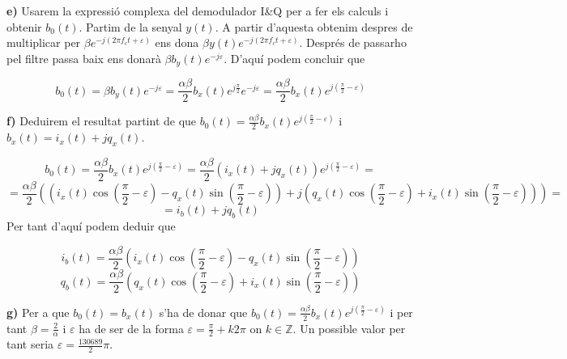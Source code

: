 \documentclass[12pt, a4papre]{article}
\begin{document}
	\textbf{e)} Usarem la expressió complexa del demodulador I\&Q per a fer els calculs i obtenir $b_0(t)$. Partim de la senyal $y(t)$. A partir d'aquesta obtenim despres de multiplicar per $\beta e^{-j(2\pi f_ct + \varepsilon)}$ ens dona $ \beta y(t)e^{-j(2\pi f_ct + \varepsilon)}$. Després de passarho pel filtre passa baix ens donarà $ \beta b_y(t) e^{-j\varepsilon}$. D'aquí podem concluir que
	
	\[
		b_0(t) = \beta b_y(t) e^{-j\varepsilon} = \frac{\alpha\beta}{2}b_x(t)e^{j\frac{\pi}{2}}e^{-j\varepsilon} = \frac{\alpha\beta}{2}b_x(t)e^{j(\frac{\pi}{2} - \varepsilon)}
	\]
	
	\textbf{f)} Deduirem el resultat partint de que $b_0(t) = \frac{\alpha\beta}{2}b_x(t)e^{j(\frac{\pi}{2} - \varepsilon)}$ i $b_x(t) = i_x(t) + jq_x(t)$.
	
	\[
		b_0(t) = \frac{\alpha\beta}{2}b_x(t)e^{j(\frac{\pi}{2} - \varepsilon)} =  \frac{\alpha\beta}{2}(i_x(t) + jq_x(t))e^{j(\frac{\pi}{2} - \varepsilon)} = 
	\]
	\[
		= \frac{\alpha\beta}{2}((i_x(t)\cos(\frac{\pi}{2} - \varepsilon) - q_x(t)\sin(\frac{\pi}{2} - \varepsilon)) + j(q_x(t)\cos(\frac{\pi}{2} - \varepsilon) + i_x(t)\sin(\frac{\pi}{2} - \varepsilon))) =
	\]
	\[
		= i_b(t) + jq_b(t)
	\]
	Per tant d'aquí podem deduir que
	
	\[
		i_b(t) =  \frac{\alpha\beta}{2}(i_x(t)\cos(\frac{\pi}{2} - \varepsilon) - q_x(t)\sin(\frac{\pi}{2} - \varepsilon))
	\]
	\[
		 q_b(t) = \frac{\alpha\beta}{2}(q_x(t)\cos(\frac{\pi}{2} - \varepsilon) + i_x(t)\sin(\frac{\pi}{2} - \varepsilon))
	\]
	
	\textbf{g)} Per a que $b_0(t) = b_x(t)$ s'ha de donar que $b_0(t) = \frac{\alpha\beta}{2}b_x(t)e^{j(\frac{\pi}{2} - \varepsilon)}$ i per tant $\beta = \frac{2}{\alpha}$ i $\varepsilon$ ha de ser de la forma $\varepsilon = \frac{\pi}{2} + k2\pi$ on $k \in \mathbb{Z}$. Un possible valor per tant seria $\varepsilon = \frac{130689}{2}\pi$.
\end{document}

